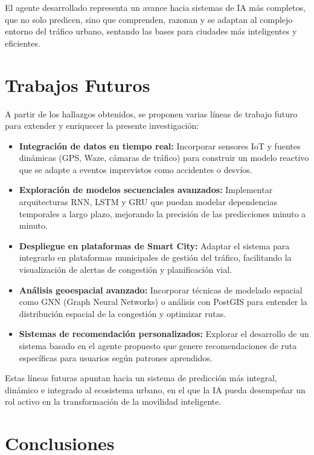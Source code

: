 \documentclass{svproc} %
\begin{document}
El agente desarrollado representa un avance hacia sistemas de IA más completos, que no solo predicen, sino que comprenden, razonan y se adaptan al complejo entorno del tráfico urbano, sentando las bases para ciudades más inteligentes y eficientes.

\section{Trabajos Futuros}

A partir de los hallazgos obtenidos, se proponen varias líneas de trabajo futuro para extender y enriquecer la presente investigación:

\begin{itemize}
    \item \textbf{Integración de datos en tiempo real:} Incorporar sensores IoT y fuentes dinámicas (GPS, Waze, cámaras de tráfico) para construir un modelo reactivo que se adapte a eventos imprevistos como accidentes o desvíos.
    
    \item \textbf{Exploración de modelos secuenciales avanzados:} Implementar arquitecturas RNN, LSTM y GRU que puedan modelar dependencias temporales a largo plazo, mejorando la precisión de las predicciones minuto a minuto.
    
    \item \textbf{Despliegue en plataformas de Smart City:} Adaptar el sistema para integrarlo en plataformas municipales de gestión del tráfico, facilitando la visualización de alertas de congestión y planificación vial.
    
    \item \textbf{Análisis geoespacial avanzado:} Incorporar técnicas de modelado espacial como GNN (Graph Neural Networks) o análisis con PostGIS para entender la distribución espacial de la congestión y optimizar rutas.
    
    \item \textbf{Sistemas de recomendación personalizados:} Explorar el desarrollo de un sistema basado en el agente propuesto que genere recomendaciones de ruta específicas para usuarios según patrones aprendidos.
\end{itemize}

Estas líneas futuras apuntan hacia un sistema de predicción más integral, dinámico e integrado al ecosistema urbano, en el que la IA pueda desempeñar un rol activo en la transformación de la movilidad inteligente.

\section{Conclusiones}
\end{document}
